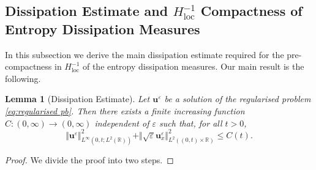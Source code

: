 \documentclass[11pt,a4paper,reqno]{amsart}
\numberwithin{equation}{section}
\newtheorem{lemma}{Lemma}[section]
\theoremstyle{definition}
\theoremstyle{remark}
\newcommand{\bu}{\mathbf{u}}
\newcommand{\loc}{\mathrm{loc}}
\renewcommand{\leq}{\leqslant}
\begin{document}
{\subsection{Dissipation Estimate and $H^{-1}_\loc$ Compactness of Entropy Dissipation Measures}

In this subsection we derive the main dissipation estimate required for the pre-compactness in $H^{-1}_\loc$ of the entropy dissipation measures. Our main result is the following. 

\begin{lemma}[Dissipation Estimate]\label{lem:dissipation}
    Let $\bu^\varepsilon$ be a solution of the regularised problem \eqref{eq:regularised pb}. Then there exists a finite increasing function $C:(0,\infty) \to (0,\infty)$ independent of $\varepsilon$ such that, for all $t>0$, 
    \begin{equation}\label{eq:convex entropy estimate}
    \Vert \bu^\varepsilon\Vert^2_{L^\infty(0,t;L^2(\mathbb{R}))} + \Vert \sqrt{\varepsilon}\bu^\varepsilon_x \Vert^2_{L^2((0,t)\times\mathbb{R})} \leq C(t). 
\end{equation}
\end{lemma}

\begin{proof}
We divide the proof into two steps. 


\end{proof}}
\end{document}
